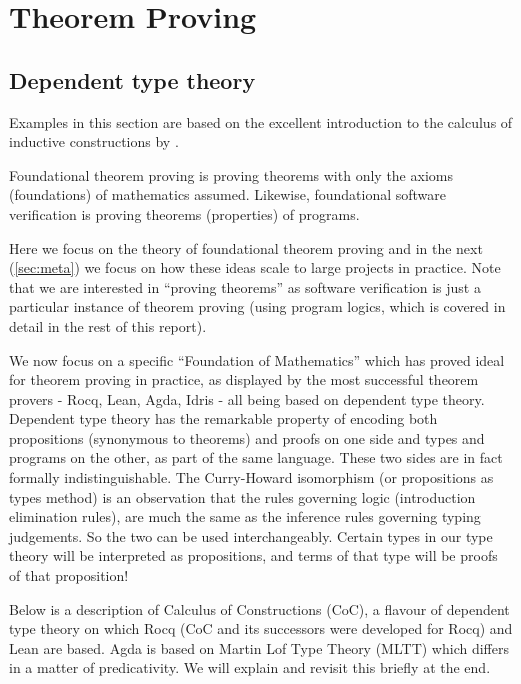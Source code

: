 \section{Theorem Proving}

\subsection{Dependent type theory}
\label{sec:coc}

Examples in this section are based on the excellent introduction to the calculus of inductive constructions by \citet{coc}.

Foundational theorem proving is proving theorems with only the axioms (foundations) of mathematics assumed. Likewise, foundational software verification is
proving theorems (properties) of programs.

Here we focus on the theory of foundational theorem proving and in the next (\ref{sec:meta}) we focus on how these ideas scale to large projects in practice.
Note that we are interested in ``proving theorems'' as software verification is just a particular instance of theorem proving (using program logics, which
is covered in detail in the rest of this report).



We now focus on a specific ``Foundation of Mathematics'' which has proved ideal for theorem proving in practice, as displayed by the most
successful theorem provers - Rocq, Lean, Agda, Idris - all being based on dependent type theory. Dependent type theory has the remarkable property of encoding both
propositions (synonymous to theorems) and proofs on one side and types and programs on the other, as part of the same language. These two sides are in fact formally indistinguishable.
The Curry-Howard isomorphism (or propositions as types method) is an observation that the rules governing logic (introduction elimination rules), are much the same as the inference
rules governing typing judgements. So the two can be used interchangeably. Certain types in our type theory will be interpreted as propositions, and terms of that type will be
proofs of that proposition!

Below is a description of Calculus of Constructions (CoC), a flavour of dependent type theory on which Rocq (CoC and its successors were developed for Rocq) and Lean are based.
Agda is based on Martin Lof Type Theory (MLTT) which differs in a matter of predicativity. We will explain and revisit this briefly at the end.

